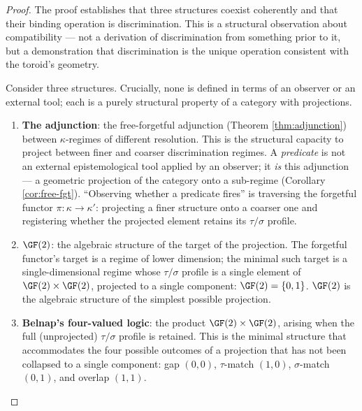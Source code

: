 \begin{proof}
The proof establishes that three structures coexist
coherently and that their binding operation is
discrimination. This is a structural observation about
compatibility --- not a derivation of discrimination from
something prior to it, but a demonstration that
discrimination is the unique operation consistent with
the toroid's geometry.

Consider three structures. Crucially, none is defined in
terms of an observer or an external tool; each is a purely
structural property of a category with projections.

\begin{enumerate}[label=(\roman*),nosep]
  \item \textbf{The adjunction}: the free-forgetful
    adjunction (Theorem \ref{thm:adjunction}) between
    $\kappa$-regimes of different resolution. This is the
    structural capacity to project between finer and
    coarser discrimination regimes. A \emph{predicate} is
    not an external epistemological tool applied by an
    observer; it \emph{is} this adjunction --- a geometric
    projection of the category onto a sub-regime
    (Corollary \ref{cor:free-fgt}). ``Observing whether a
    predicate fires'' is traversing the forgetful functor
    $\pi: \kappa \to \kappa'$: projecting a finer structure
    onto a coarser one and registering whether the
    projected element retains its $\tau/\sigma$ profile.

  \item \textbf{$\GF(2)$}: the algebraic structure of the
    target of the projection. The forgetful functor's
    target is a regime of lower dimension; the minimal
    such target is a single-dimensional regime whose
    $\tau/\sigma$ profile is a single element of
    $\GF(2) \times \GF(2)$, projected to a single
    component: $\GF(2) = \{0,1\}$. $\GF(2)$ is the
    algebraic structure of the simplest possible
    projection.

  \item \textbf{Belnap's four-valued logic}: the product
    $\GF(2) \times \GF(2)$, arising when the full
    (unprojected) $\tau/\sigma$ profile is retained.
    This is the minimal structure that accommodates the
    four possible outcomes of a projection that has not
    been collapsed to a single component: gap $(0,0)$,
    $\tau$-match $(1,0)$, $\sigma$-match $(0,1)$, and
    overlap $(1,1)$.
\end{enumerate}


\end{proof}
